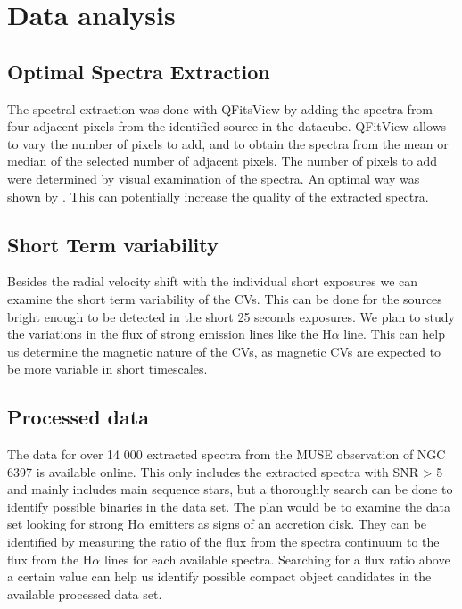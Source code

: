 \section{Data analysis}

\subsection{Optimal Spectra Extraction}

The spectral extraction was done with QFitsView by adding the spectra from four adjacent pixels from the identified source in the datacube. QFitView allows to vary the number of pixels to add, and to obtain the spectra from the mean or median of the selected number of adjacent pixels. The number of pixels to add were determined by visual examination of the spectra. An optimal way was shown by \cite{horne_emission_1986}. This can potentially increase the quality of the extracted spectra. 

\subsection{Short Term variability}

Besides the radial velocity shift with the individual short exposures we can examine the short term variability of the CVs. This can be done for the sources bright enough to be detected in the short 25 seconds exposures. We plan to study the variations in the flux of strong emission lines like the H$\alpha$ line. This can help us determine the magnetic nature of the CVs, as magnetic CVs are expected to be more variable in short timescales. 

\subsection{Processed data}

The data for over 14 000 extracted spectra from the MUSE observation of NGC 6397 is available online. This only includes the extracted spectra with SNR > 5 and mainly includes main sequence stars, but a thoroughly search can be done to identify possible binaries in the data set. The plan would be to examine the data set looking for strong H$\alpha$ emitters as signs of an accretion disk. They can be identified by measuring the ratio of the flux from the spectra continuum to the flux from the H$\alpha$ lines for each available spectra. Searching for a flux ratio above a certain value can help us identify possible compact object candidates in the available processed data set. 

